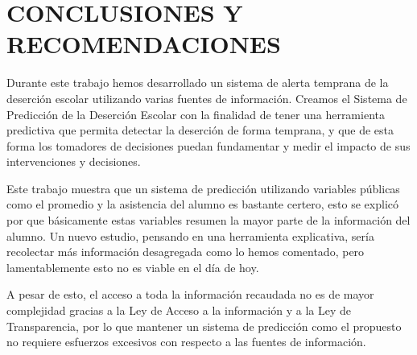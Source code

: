 \chapter{CONCLUSIONES Y RECOMENDACIONES}
\label{ch:concureco}

Durante este trabajo hemos desarrollado un sistema de alerta temprana de la deserción escolar utilizando varias fuentes de información. Creamos el Sistema de Predicción de la Deserción Escolar con la finalidad de tener una herramienta predictiva que permita detectar la deserción de forma temprana, y que de esta forma los tomadores de decisiones puedan fundamentar y medir el impacto de sus intervenciones y decisiones.

Este trabajo muestra que un sistema de predicción utilizando variables públicas como el promedio y la asistencia del alumno es bastante certero, esto se explicó por que básicamente estas variables resumen la mayor parte de la información del alumno. Un nuevo estudio, pensando en una herramienta explicativa, sería recolectar más información desagregada como lo hemos comentado, pero lamentablemente esto no es viable en el día de hoy.

A pesar de esto, el acceso a toda la información recaudada no es de mayor complejidad gracias a la Ley de Acceso a la información y a la Ley de Transparencia, por lo que mantener un sistema de predicción como el propuesto no requiere esfuerzos excesivos con respecto a las fuentes de información. 


